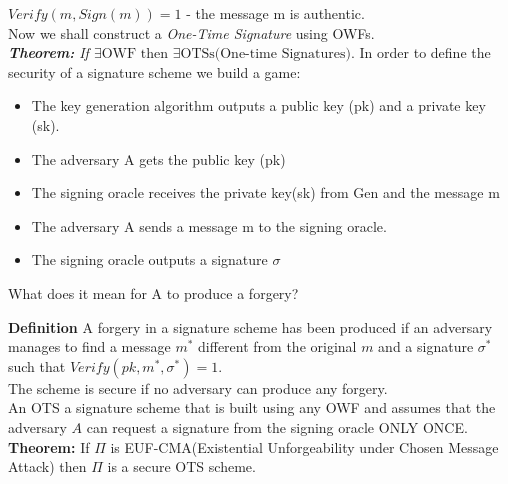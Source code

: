 \documentclass[oneside,a4paper,12pt]{book}
\begin{document}
$Verify(m, Sign(m)) = 1$ - the message m is authentic.\\

Now we shall construct a \textit{One-Time Signature} using OWFs.\\

\textit{\textbf{Theorem:} If $\exists \text{OWF} \text{ then } \exists \text{OTSs(One-time Signatures)}$}.
\newpage
In order to define the security of a signature scheme we build a game:
\begin{itemize}
\item The key generation algorithm outputs a public key (pk) and a private key (sk).
\item The adversary A gets the public key (pk)
\item The signing oracle receives the private key(sk) from Gen and the message m
\item The adversary A sends a message m to the signing oracle.
\item The signing oracle outputs a signature $\sigma$
\end{itemize}

What does it mean for A to produce a forgery?

\textbf{Definition} A forgery in a signature scheme has been produced if an adversary manages to find a message $m^*$ different from the original $m$ and a signature $\sigma^*$ such that $Verify(pk, m^*, \sigma^*)=1$.\\

The scheme is secure if no adversary can produce any forgery.\\

An OTS a signature scheme that is built using any OWF and assumes that the adversary $A$ can request a signature from the signing oracle ONLY ONCE.\\

\textbf{Theorem:} If $\Pi$ is EUF-CMA(Existential Unforgeability under Chosen Message Attack) then $\Pi$ is a secure OTS scheme.\\
\end{document}
